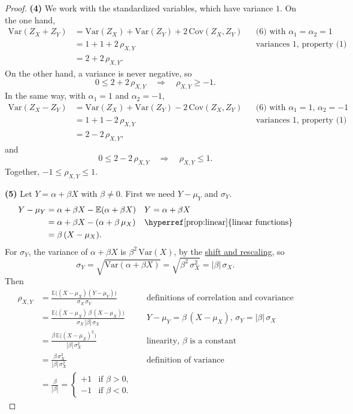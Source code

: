 \documentclass[a4paper,12pt,oneside]{report}
\begin{document}
\begin{proof}
\textbf{(4)} We work with the standardized variables, which have
variance $1$. On the one hand,
\begin{align*}
\mathrm{Var}(Z_X+Z_Y)
&=\mathrm{Var}(Z_X)+\mathrm{Var}(Z_Y)+2\,\mathrm{Cov}(Z_X,Z_Y)
&&\text{(6) with $\alpha_1=\alpha_2=1$}\\
&=1+1+2\,\rho_{X,Y}
&&\text{variances $1$, property (1)}\\
&=2+2\,\rho_{X,Y}.
\end{align*}
On the other hand, a variance is never negative, so
\[
0\le2+2\,\rho_{X,Y}
\quad\Longrightarrow\quad
\rho_{X,Y}\ge-1 .
\]
In the same way, with $\alpha_1=1$ and $\alpha_2=-1$,
\begin{align*}
\mathrm{Var}(Z_X-Z_Y)
&=\mathrm{Var}(Z_X)+\mathrm{Var}(Z_Y)-2\,\mathrm{Cov}(Z_X,Z_Y)
&&\text{(6) with $\alpha_1=1$, $\alpha_2=-1$}\\
&=1+1-2\,\rho_{X,Y}
&&\text{variances $1$, property (1)}\\
&=2-2\,\rho_{X,Y},
\end{align*}
and
\[
0\le2-2\,\rho_{X,Y}
\quad\Longrightarrow\quad
\rho_{X,Y}\le1 .
\]
Together, $-1\le\rho_{X,Y}\le1$.

\textbf{(5)} Let $Y=\alpha+\beta X$ with $\beta\ne0$. First we need $Y-\mu_Y$
and $\sigma_Y$.
\begin{align*}
Y-\mu_Y
&=\alpha+\beta X-\mathbb{E}(\alpha+\beta X)
&&\text{$Y=\alpha+\beta X$}\\
&=\alpha+\beta X-(\alpha+\beta\,\mu_X)
&&\text{\hyperref[prop:linear]{linear functions}}\\
&=\beta\,(X-\mu_X).
\end{align*}
For $\sigma_Y$, the variance of $\alpha+\beta X$ is $\beta^2\,\mathrm{Var}(X)$, by the
\hyperref[var-affine]{shift and rescaling}, so
\[
\sigma_Y=\sqrt{\mathrm{Var}(\alpha+\beta X)}=\sqrt{\beta^2\,\sigma_X^2}=|\beta|\,\sigma_X .
\]
Then
\begin{align*}
\rho_{X,Y}
&=\frac{\mathbb{E}\big((X-\mu_X)(Y-\mu_Y)\big)}{\sigma_X\,\sigma_Y}
&&\text{definitions of correlation and covariance}\\
&=\frac{\mathbb{E}\big((X-\mu_X)\,\beta\,(X-\mu_X)\big)}{\sigma_X\,|\beta|\,\sigma_X}
&&\text{$Y-\mu_Y=\beta\,(X-\mu_X)$, $\sigma_Y=|\beta|\,\sigma_X$}\\
&=\frac{\beta\,\mathbb{E}\big((X-\mu_X)^2\big)}{|\beta|\,\sigma_X^2}
&&\text{linearity, $\beta$ is a constant}\\
&=\frac{\beta\,\sigma_X^2}{|\beta|\,\sigma_X^2}
&&\text{definition of variance}\\
&=\frac{\beta}{|\beta|}
=\begin{cases}+1&\text{if }\beta>0,\\-1&\text{if }\beta<0.\end{cases}
\end{align*}


\end{proof}
\end{document}
